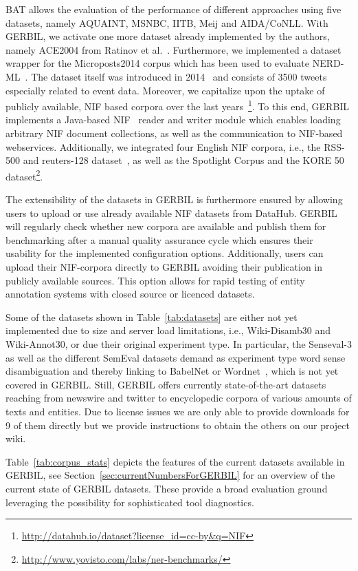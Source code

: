 BAT allows the evaluation of the performance of different a\-ppro\-aches using five datasets, namely AQUAINT, MSNBC, IITB, Meij and AIDA/CoNLL.
With GERBIL, we activate one more dataset already implemented by the authors, namely ACE2004 from Ratinov et al.~\cite{rat:rot}.
Furthermore, we implemented a dataset wrapper for the Microposts2014 corpus which has been used to evaluate NERD-ML~\cite{rizzo2014}. 
The dataset itself was introduced in 2014~\cite{Cano2014} and consists of 3500 tweets especially related to event data.
Moreover, we capitalize upon the uptake of publicly available, NIF based corpora over the last years~\cite{yovisto,n3}\footnote{\url{http://datahub.io/dataset?license_id=cc-by&q=NIF}}.
To this end, GERBIL implements a Java-based NIF~\cite{NIF} reader and writer module which enables loading arbitrary NIF document collections, as well as the communication to NIF-based webservices.
Additionally, we integrated four English NIF corpora, i.e., the RSS-500 and reuters-128 dataset~\cite{n3}, as well as the Spotlight Corpus and the KORE 50 dataset\footnote{\url{http://www.yovisto.com/labs/ner-benchmarks/}}. 

The extensibility of the datasets in GERBIL is furthermore ensured by allowing users to upload or use already available NIF datasets from DataHub. 
GERBIL will regularly check whether new corpora are available and publish them for benchmarking after a manual quality assurance cycle which ensures their usability for the implemented configuration options.
Additionally, users can upload their NIF-corpora directly to GERBIL avoiding their publication in publicly available sources.
This option allows for rapid testing of entity annotation systems with closed source or licenced datasets.

Some of the datasets shown in Table~\ref{tab:datasets} are either not yet implemented due to size and server load limitations, i.e., Wiki-Disamb30 and Wiki-Annot30, or due their original experiment type.
In particular, the Senseval-3 as well as the different SemEval datasets demand as experiment type word sense disambiguation and thereby linking to BabelNet or Wordnet~\cite{wordnet}, which is not yet covered in GERBIL.
Still, GERBIL offers currently \overalldatasets state-of-the-art datasets reaching from newswire and twitter to encyclopedic corpora of various amounts of texts and entities.
Due to license issues we are only able to provide downloads for 9 of them directly but we provide instructions to obtain the others on our project wiki.

Table~\ref{tab:corpus_stats} depicts the features of the current datasets available in GERBIL, see Section~\ref{sec:currentNumbersForGERBIL} for an overview of the current state of GERBIL datasets.
These provide a broad evaluation ground leveraging the possibility for sophisticated tool diagnostics.

